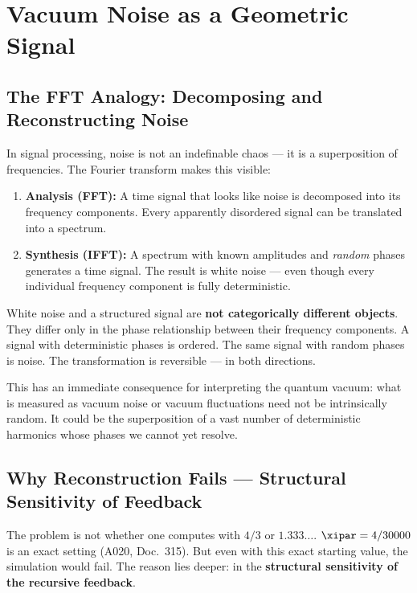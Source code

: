 \section{Vacuum Noise as a Geometric Signal}

\subsection{The FFT Analogy: Decomposing and Reconstructing Noise}

In signal processing, noise is not an indefinable chaos — it is a superposition of
frequencies. The Fourier transform makes this visible:

\begin{enumerate}
    \item \textbf{Analysis (FFT):} A time signal that looks like noise is decomposed
    into its frequency components. Every apparently disordered signal can be
    translated into a spectrum.
    \item \textbf{Synthesis (IFFT):} A spectrum with known amplitudes and
    \emph{random} phases generates a time signal. The result is white noise —
    even though every individual frequency component is fully deterministic.
\end{enumerate}

\begin{keypoint}
White noise and a structured signal are \textbf{not categorically different objects}.
They differ only in the phase relationship between their frequency components.
A signal with deterministic phases is ordered. The same signal with random phases
is noise. The transformation is reversible — in both directions.
\end{keypoint}

This has an immediate consequence for interpreting the quantum vacuum: what is
measured as vacuum noise or vacuum fluctuations need not be intrinsically random.
It could be the superposition of a vast number of deterministic harmonics whose
phases we cannot yet resolve.


\subsection{Why Reconstruction Fails — Structural Sensitivity of Feedback}

The problem is not whether one computes with $4/3$ or $1.333\ldots$.
$\xipar = 4/30000$ is an exact setting (A020, Doc.~315). But even with this
exact starting value, the simulation would fail. The reason lies deeper: in the \textbf{structural
sensitivity of the recursive feedback}.


